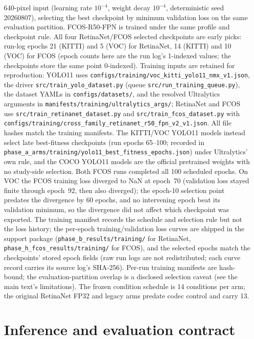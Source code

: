 \documentclass[10pt]{article}
\begin{document}
640-pixel input (learning rate $10^{-4}$, weight decay $10^{-4}$,
deterministic seed 20260807), selecting the best checkpoint by minimum
validation loss on the same evaluation partition. FCOS-R50-FPN is trained
under the same profile and checkpoint rule. All four RetinaNet/FCOS
selected checkpoints are early picks: run-log epochs 21 (KITTI) and 5 (VOC)
for RetinaNet, 14 (KITTI) and 10 (VOC) for FCOS
(epoch counts here are the run log's 1-indexed values; the checkpoints
store the same point 0-indexed). Training inputs are retained for
reproduction: YOLO11 uses \texttt{configs/training/voc\_kitti\_yolo11\_nmx\_v1.json},
the driver \texttt{src/train\_yolo\_dataset.py} (queue
\texttt{src/run\_training\_queue.py}), the dataset YAMLs in
\texttt{configs/datasets/}, and the resolved Ultralytics arguments in
\texttt{manifests/training/ultralytics\_args/}; RetinaNet and FCOS use
\texttt{src/train\_retinanet\_dataset.py} and \texttt{src/train\_fcos\_dataset.py}
with \texttt{configs/training/cross\_family\_retinanet\_r50\_fpn\_v2\_v1.json}.
All file hashes match the training manifests. The KITTI/VOC YOLO11 models instead select
late best-fitness checkpoints (run epochs 65--100; recorded in
\texttt{phase\_a\_arms/training/yolo11\_best\_fitness\_epochs.json})
under Ultralytics' own rule, and the COCO YOLO11 models are the official
pretrained weights with no study-side selection. Both FCOS runs completed all 100
scheduled epochs. On VOC the FCOS training loss diverged to NaN at epoch~70
(validation loss stayed finite through epoch~92, then also diverged); the
epoch-10 selection point predates the divergence by 60 epochs, and no
intervening epoch beat its validation minimum, so the divergence did not
affect which checkpoint was exported. The training manifest
records the schedule and selection rule but not the loss history; the
per-epoch training/validation loss curves are shipped in the support
package (\texttt{phase\_b\_results/training/} for RetinaNet,
\texttt{phase\_h\_fcos\_results/training/} for FCOS), and the selected
epochs match the checkpoints' stored epoch fields (raw run logs are not
redistributed; each curve record carries its source log's SHA-256). Per-run training
manifests are hash-bound; the evaluation-partition overlap is a disclosed
selection caveat (see the main text's limitations). The frozen condition schedule is
14 conditions per arm; the original RetinaNet FP32 and legacy arms predate codec
control and carry 13.

\section{Inference and evaluation contract}
\end{document}
